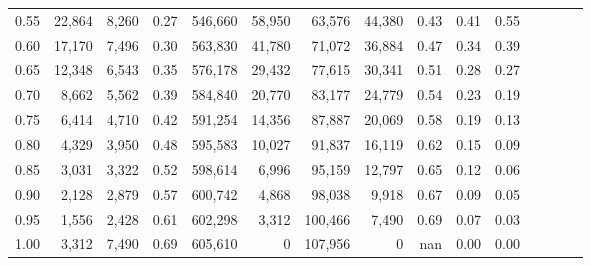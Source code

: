 \begin{tabular}{rrrcrrrrrrrrrrr}
0.55 &  22,864 &  8,260 &                                       0.27 &  546,660 &   58,950 &   63,576 &   44,380 &  0.43 &  0.41 &                         0.55 \\
0.60 &  17,170 &  7,496 &                                       0.30 &  563,830 &   41,780 &   71,072 &   36,884 &  0.47 &  0.34 &                         0.39 \\
0.65 &  12,348 &  6,543 &                                       0.35 &  576,178 &   29,432 &   77,615 &   30,341 &  0.51 &  0.28 &                         0.27 \\
0.70 &   8,662 &  5,562 &                                       0.39 &  584,840 &   20,770 &   83,177 &   24,779 &  0.54 &  0.23 &                         0.19 \\
0.75 &   6,414 &  4,710 &                                       0.42 &  591,254 &   14,356 &   87,887 &   20,069 &  0.58 &  0.19 &                         0.13 \\
0.80 &   4,329 &  3,950 &                                       0.48 &  595,583 &   10,027 &   91,837 &   16,119 &  0.62 &  0.15 &                         0.09 \\
0.85 &   3,031 &  3,322 &                                       0.52 &  598,614 &    6,996 &   95,159 &   12,797 &  0.65 &  0.12 &                         0.06 \\
0.90 &   2,128 &  2,879 &                                       0.57 &  600,742 &    4,868 &   98,038 &    9,918 &  0.67 &  0.09 &                         0.05 \\
0.95 &   1,556 &  2,428 &                                       0.61 &  602,298 &    3,312 &  100,466 &    7,490 &  0.69 &  0.07 &                         0.03 \\
1.00 &   3,312 &  7,490 &                                       0.69 &  605,610 &        0 &  107,956 &        0 &   nan &  0.00 &                         0.00 \\
\bottomrule
\end{tabular}
